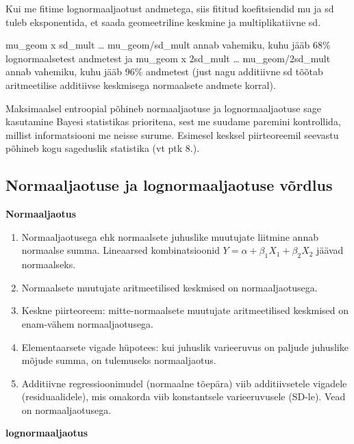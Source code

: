 \documentclass[]{book}
\begin{document}
Kui me fitime lognormaaljaotust andmetega, siis fititud koefitsiendid mu ja sd tuleb eksponentida, et saada geomeetriline keskmine ja multiplikatiivne sd.

mu\_geom x sd\_mult \ldots{} mu\_geom/sd\_mult annab vahemiku, kuhu jääb 68\% lognormaalsetest andmetest ja mu\_geom x 2sd\_mult \ldots{} mu\_geom/2sd\_mult annab vahemiku, kuhu jääb 96\% andmetest (just nagu additiivne sd tõõtab aritmeetilise additiivse keskmisega normaalsete andmete korral).

Maksimaalsel entroopial põhineb normaaljaotuse ja lognormaaljaotuse sage kasutamine Bayesi statistikas prioritena, sest me suudame paremini kontrollida, millist informatsiooni me neisse surume. Esimesel kesksel piirteoreemil seevastu põhineb kogu sageduslik statistika (vt ptk 8.).

\hypertarget{normaaljaotuse-ja-lognormaaljaotuse-vordlus}{%
\subsection{Normaaljaotuse ja lognormaaljaotuse võrdlus}\label{normaaljaotuse-ja-lognormaaljaotuse-vordlus}}

\textbf{Normaaljaotus}

\begin{enumerate}
\def\labelenumi{\arabic{enumi}.}
\item
  Normaaljaotusega ehk normaalsete juhuslike muutujate liitmine annab normaalse summa. Lineaarsed kombinatsioonid \(Y= \alpha + \beta_1X_1 + \beta_2X_2\) jäävad normaalseks.
\item
  Normaalsete muutujate aritmeetilised keskmised on normaaljaotusega.
\item
  Keskne piirteoreem: mitte-normaalsete muutujate aritmeetilised keskmised on enam-vähem normaaljaotusega.
\item
  Elementaarsete vigade hüpotees: kui juhuslik varieeruvus on paljude juhuslike mõjude summa, on tulemuseks normaaljaotus.
\item
  Additiivne regressioonimudel (normaalne tõepära) viib additiivsetele vigadele (residuaalidele), mis omakorda viib konstantsele varieeruvusele (SD-le). Vead on normaaljaotusega.
\end{enumerate}

\textbf{lognormaaljaotus}
\end{document}
